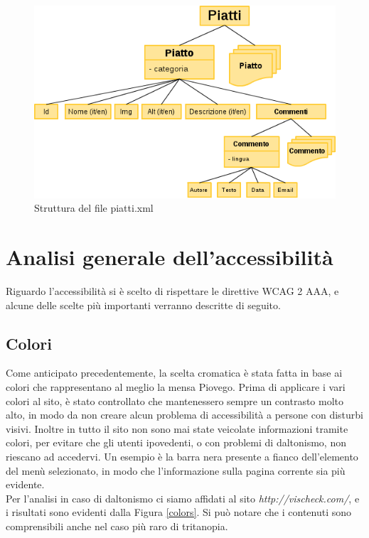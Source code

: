 \documentclass[10pt,a4paper,onecolumn]{article}
\begin{document}
\begin{figure}[h]
\centering
\includegraphics[scale=0.55]{alberoXML}
\caption{Struttura del file piatti.xml}
\label{xml}
\end{figure}

\section{Analisi generale dell'accessibilità}

Riguardo l'accessibilità si è scelto di rispettare le direttive WCAG 2 AAA, e alcune delle scelte più importanti verranno descritte di seguito.

\subsection{Colori}

Come anticipato precedentemente, la scelta cromatica è stata fatta in base ai colori che rappresentano al meglio la mensa Piovego. Prima di applicare i vari colori al sito, è stato controllato che mantenessero sempre un contrasto molto alto, in modo da non creare alcun problema di accessibilità a persone con disturbi visivi. Inoltre in tutto il sito non sono mai state veicolate informazioni tramite colori, per evitare che gli utenti ipovedenti, o con problemi di daltonismo, non riescano ad accedervi. Un esempio è la barra nera presente a fianco dell'elemento del menù selezionato, in modo che l'informazione sulla pagina corrente sia più evidente. \\
Per l'analisi in caso di daltonismo ci siamo affidati al sito \textit{http://vischeck.com/}, e i risultati sono evidenti dalla Figura \ref{colors}. Si può notare che i contenuti sono comprensibili anche nel caso più raro di tritanopia. \\
\end{document}
